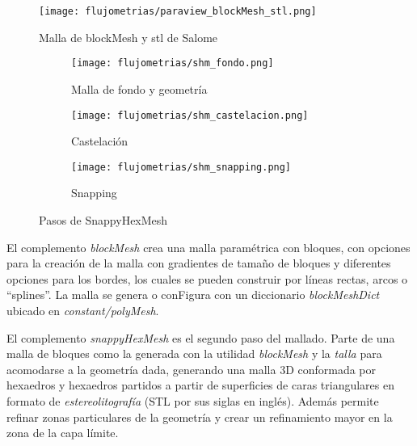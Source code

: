 \begin{figure}
    \centering
    \texttt{[image: flujometrias/paraview\_blockMesh\_stl.png]}
    \caption{Malla de blockMesh y stl de Salome}\label{fig:paraview_blockMesh_stl}
\end{figure}

\begin{figure}[t!]
    \centering
    \begin{subfigure}[t]{0.5\textwidth}
        \centering
        \texttt{[image: flujometrias/shm\_fondo.png]}
        \caption{Malla de fondo y geometría}
    \end{subfigure}%
    \begin{subfigure}[t]{0.5\textwidth}
        \centering
        \texttt{[image: flujometrias/shm\_castelacion.png]}
        \caption{Castelación}
    \end{subfigure}
    \begin{subfigure}[t]{0.5\textwidth}
        \centering
        \texttt{[image: flujometrias/shm\_snapping.png]}
        \caption{Snapping}
    \end{subfigure}
    \caption{Pasos de SnappyHexMesh\parencite{shm_steps}}\label{fig:openfoam_shm_pasos}
\end{figure}


El complemento \emph{blockMesh} crea una malla paramétrica con bloques, con
opciones para la creación de la malla con gradientes de tamaño de bloques y
diferentes opciones para los bordes, los cuales se pueden construir por líneas
rectas, arcos o ``splines''.
%
La malla se genera o conFigura con un diccionario \emph{blockMeshDict} ubicado
en \emph{constant/polyMesh}.

El complemento \emph{snappyHexMesh} es el segundo paso del mallado.
%
Parte de una malla de bloques como la generada con la utilidad \emph{blockMesh}
y la \emph{talla} para acomodarse a la geometría dada, generando una malla 3D
conformada por hexaedros y hexaedros partidos a partir de superficies de caras
triangulares en formato de \emph{estereolitografía} (STL por sus siglas en
inglés).
%
Además permite refinar zonas particulares de la geometría y crear un
refinamiento mayor en la zona de la capa límite.
